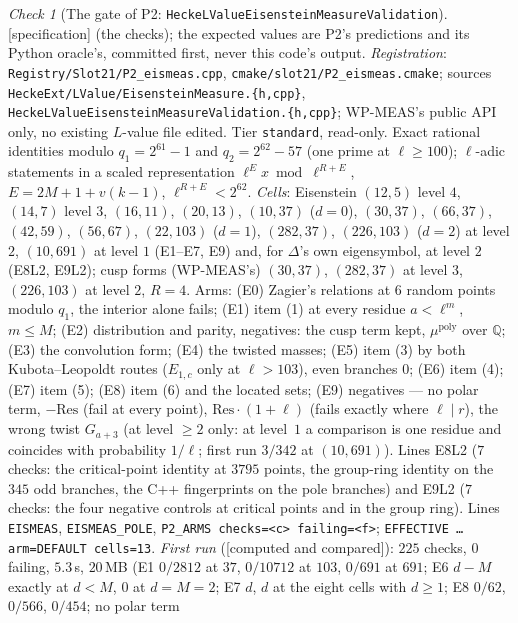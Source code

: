 \documentclass[11pt]{article}
\theoremstyle{remark}
\newtheorem{checkitem}[theorem]{Check}
\newcommand{\Q}{\mathbb{Q}}
\newcommand{\CMPD}{\textsf{[computed and compared]}}   %
\newcommand{\SPEC}{\textsf{[specification]}}           %
\begin{document}
\begin{checkitem}[The gate of P2: \texttt{HeckeLValueEisensteinMeasureValidation}]\label{chk:lveismeas}
\SPEC{} (the checks); the expected values are P2's predictions and its Python oracle's, committed first, never this code's output. \emph{Registration}: \texttt{Registry/Slot21/P2\_eismeas.cpp},
\texttt{cmake/slot21/P2\_eismeas.cmake}; sources \texttt{HeckeExt/LValue/EisensteinMeasure.\{h,cpp\}}, \texttt{HeckeLValue\allowbreak Eisenstein\allowbreak Measure\allowbreak Validation.\{h,cpp\}}; WP-MEAS's public API only, no
existing $L$-value file edited. Tier \texttt{standard}, read-only. Exact rational identities modulo $q_1=2^{61}-1$ and $q_2=2^{62}-57$ (one prime at $\ell\ge100$); $\ell$-adic statements in a scaled
representation $\ell^{E}x\bmod\ell^{R+E}$, $E=2M+1+v(k-1)$, $\ell^{R+E}<2^{62}$. \emph{Cells}: Eisenstein $(12,5)$ level $4$, $(14,7)$ level $3$, $(16,11)$, $(20,13)$, $(10,37)$ ($d=0$),
$(30,37)$, $(66,37)$, $(42,59)$, $(56,67)$, $(22,103)$ ($d=1$), $(282,37)$, $(226,103)$ ($d=2$) at level $2$, $(10,691)$ at level $1$ (E1--E7, E9) and, for $\Delta$'s own eigensymbol, at level $2$ (E8L2, E9L2); cusp forms (WP-MEAS's) $(30,37)$, $(282,37)$ at level $3$,
$(226,103)$ at level $2$, $R=4$. Arms: (E0) Zagier's relations at $6$ random points modulo $q_1$, the interior alone fails; (E1) item (1) at every residue $a<\ell^{m}$, $m\le M$; (E2) distribution and parity,
negatives: the cusp term kept, $\mu^{\mathrm{poly}}$ over $\Q$; (E3) the convolution form; (E4) the twisted masses; (E5) item (3) by both Kubota--Leopoldt routes ($E_{1,c}$ only at $\ell>103$), even
branches $0$; (E6) item (4); (E7) item (5); (E8) item (6) and the located sets; (E9) negatives --- no polar term, $-\mathrm{Res}$ (fail at every point), $\mathrm{Res}\cdot(1+\ell)$ (fails exactly where
$\ell\mid r$), the wrong twist $G_{a+3}$ (at level $\ge2$ only: at level~$1$ a comparison is one residue and coincides with probability $1/\ell$; first run $3/342$ at $(10,691)$). Lines
E8L2 ($7$ checks: the critical-point identity at $3795$ points, the group-ring identity on the $345$ odd branches, the C++ fingerprints on the pole branches) and E9L2 ($7$ checks: the four negative controls at critical points and in the group ring). Lines
\texttt{EISMEAS}, \texttt{EISMEAS\_POLE}, \texttt{P2\_ARMS checks=<c> failing=<f>}; \texttt{EFFECTIVE \dots{} arm=DEFAULT cells=13}. \emph{First run} (\CMPD): $225$ checks, $0$ failing,
$5.3$\,s, $20$\,MB (E1 $0/2812$ at $37$, $0/10712$ at $103$, $0/691$ at $691$; E6 $d-M$ exactly at $d<M$, $0$ at $d=M=2$; E7 $d$, $d$ at the eight cells with $d\ge1$; E8 $0/62$, $0/566$, $0/454$; no polar term

\end{checkitem}
\end{document}
